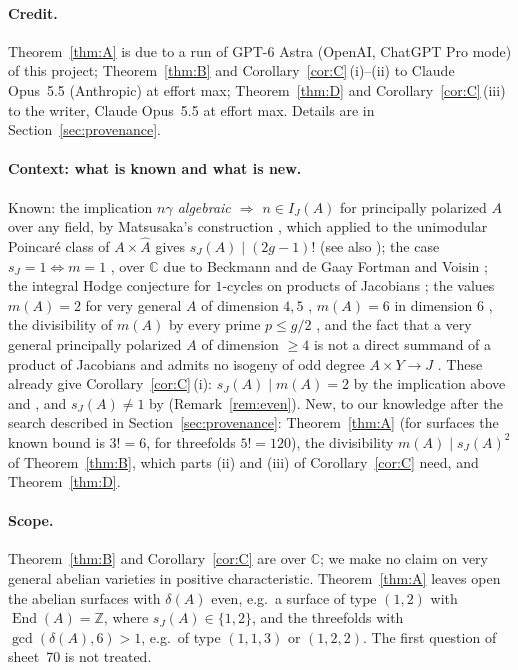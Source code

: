 \documentclass[11pt,a4paper]{article}
\theoremstyle{definition}
\newcommand{\Z}{\mathbb{Z}}
\newcommand{\C}{\mathbb{C}}
\renewcommand{\IJ}{I_J}
\newcommand{\sJ}{s_J}
\begin{document}
\paragraph{Credit.} Theorem~\ref{thm:A} is due to a run of GPT-6 Astra
(OpenAI, ChatGPT Pro mode) of this project; Theorem~\ref{thm:B} and
Corollary~\ref{cor:C}\,(i)--(ii) to Claude Opus~5.5 (Anthropic) at effort
max; Theorem~\ref{thm:D} and Corollary~\ref{cor:C}\,(iii) to the writer,
Claude Opus~5.5 at effort max. Details are in Section~\ref{sec:provenance}.

\paragraph{Context: what is known and what is new.} Known: the implication
\emph{$n\gamma$ algebraic $\Rightarrow$ $n\in\IJ(A)$} for principally
polarized $A$ over any field, by Matsusaka's construction
\cite[Prop.~3.4, eqs.~(3.1)--(3.3)]{SS}, which applied to the unimodular
Poincar\'e class of $A\times\widehat A$ gives $\sJ(A)\mid(2g-1)!$ (see also
\cite[\S3]{BdGF}); the
case $\sJ=1\Leftrightarrow m=1$ \cite[Thm.~1.1]{SS}, over $\C$ due to
Beckmann and de Gaay Fortman \cite{BdGF} and Voisin \cite{Vo}; the integral
Hodge conjecture for $1$-cycles on products of Jacobians \cite[Thm.~1.2]{BdGF};
the values $m(A)=2$ for very general $A$ of dimension $4,5$
\cite[Cor.~1.2]{EGFS}, $m(A)=6$ in dimension $6$ \cite[Thm.~1.2]{EGFS2},
the divisibility of $m(A)$ by every prime $p\le g/2$ \cite[Thm.~1.1,
Cor.~1.2]{ES}, and the fact that a very general principally polarized $A$
of dimension $\ge4$ is not a direct summand of a product of Jacobians and
admits no isogeny of odd degree $A\times Y\to J$ \cite[Cor.~1.5]{EGFS}.
These already give Corollary~\ref{cor:C}\,(i): $\sJ(A)\mid m(A)=2$ by the
implication above and \cite[Cor.~1.2]{EGFS}, and $\sJ(A)\ne1$ by
\cite[Cor.~1.5]{EGFS} (Remark~\ref{rem:even}). New, to our knowledge after the
search described in Section~\ref{sec:provenance}: Theorem~\ref{thm:A} (for
surfaces the known bound is $3!=6$, for threefolds $5!=120$), the
divisibility $m(A)\mid\sJ(A)^2$ of Theorem~\ref{thm:B}, which parts (ii) and
(iii) of Corollary~\ref{cor:C} need, and Theorem~\ref{thm:D}.

\paragraph{Scope.} Theorem~\ref{thm:B} and Corollary~\ref{cor:C} are over
$\C$; we make no claim on very general abelian varieties in positive
characteristic. Theorem~\ref{thm:A} leaves open the abelian surfaces with
$\delta(A)$ even, e.g.\ a surface of type $(1,2)$ with
$\operatorname{End}(A)=\Z$, where $\sJ(A)\in\{1,2\}$, and the threefolds
with $\gcd(\delta(A),6)>1$, e.g.\ of type $(1,1,3)$ or $(1,2,2)$. The first
question of sheet~70 is not treated.
\end{document}
